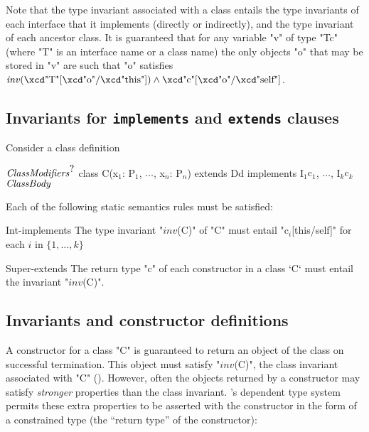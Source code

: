 Note that the type invariant associated with a class entails the type
invariants of each interface that it implements (directly or indirectly), and
the type invariant of each ancestor class.
It is guaranteed that for any variable \xcd"v" of
type \xcd"T{c}" (where \xcd"T" is an interface name or a class name) the only
objects \xcd"o" that may be stored in \xcd"v" are such that \xcd"o" satisfies
$\mathit{inv}(\mbox{\xcd"T"}[\mbox{\xcd"o"}/\mbox{\xcd"this"}])
\wedge \mbox{\xcd"c"}[\mbox{\xcd"o"}/\mbox{\xcd"self"}]$.



\subsection{Invariants for {\tt implements} and {\tt extends} clauses}\label{DepType:Implements}
\label{DepType:Extends}
Consider a class definition
\begin{xtenmath}
$\mbox{\emph{ClassModifiers}}^{\mbox{?}}$
class C(x$_1$: P$_1$, $\dots$, x$_n$: P$_n$) extends D{d}
   implements I$_1${c$_1$}, $\dots$, I$_k${c$_k$}
$\mbox{\emph{ClassBody}}$
\end{xtenmath}

Each of the following static semantics rules must be satisfied:

\begin{staticrule}{Int-implements}
The type invariant \xcdmath"$\mathit{inv}$(C)" of \xcd"C" must entail
\xcdmath"c$_i$[this/self]" for each $i$ in $\{1, \dots, k\}$
\end{staticrule}

\begin{staticrule}{Super-extends}
The return type \xcd"c" of each constructor in a class \xcd`C`
must entail the invariant \xcdmath"$\mathit{inv}$(C)".
\end{staticrule}

\subsection{Invariants and constructor definitions}

A constructor for a class \xcd"C" is guaranteed to return an object of the
class on successful termination. This object must satisfy  \xcdmath"$\mathit{inv}$(C)", the
class invariant associated with \xcd"C" ().
However,
often the objects returned by a constructor may satisfy {\em stronger}
properties than the class invariant. \Xten{}'s dependent type system
permits these extra properties to be asserted with the constructor in
the form of a constrained type (the ``return type'' of the constructor):

